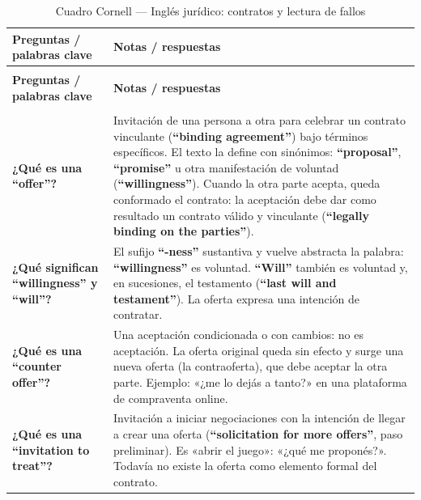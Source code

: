 \documentclass[12pt,oneside]{book}
\begin{document}
\begin{longtable}{
    >{\raggedright\arraybackslash}p{}
    >{\raggedright\arraybackslash}p{}
}
\caption{Cuadro Cornell --- Inglés jurídico: contratos y lectura de fallos} \\
\toprule
\textbf{Preguntas / palabras clave} & \textbf{Notas / respuestas} \\
\midrule
\endfirsthead

\multicolumn{2}{c}{\tablename\ \thetable{} (continuación)} \\
\toprule
\textbf{Preguntas / palabras clave} & \textbf{Notas / respuestas} \\
\midrule
\endhead

\midrule
\multicolumn{2}{r}{Continúa en la página siguiente} \\
\endfoot

\bottomrule
\endlastfoot

\textbf{¿Qué es una ``offer''?} &
Invitación de una persona a otra para celebrar un contrato vinculante (\textbf{``binding agreement''}) bajo términos específicos. El texto la define con sinónimos: \textbf{``proposal''}, \textbf{``promise''} u otra manifestación de voluntad (\textbf{``willingness''}). Cuando la otra parte acepta, queda conformado el contrato: la aceptación debe dar como resultado un contrato válido y vinculante (\textbf{``legally binding on the parties''}). \\

\textbf{¿Qué significan ``willingness'' y ``will''?} &
El sufijo \textbf{``-ness''} sustantiva y vuelve abstracta la palabra: \textbf{``willingness''} es voluntad. \textbf{``Will''} también es voluntad y, en sucesiones, el testamento (\textbf{``last will and testament''}). La oferta expresa una intención de contratar. \\

\textbf{¿Qué es una ``counter offer''?} &
Una aceptación condicionada o con cambios: no es aceptación. La oferta original queda sin efecto y surge una nueva oferta (la contraoferta), que debe aceptar la otra parte. Ejemplo: «¿me lo dejás a tanto?» en una plataforma de compraventa online. \\

\textbf{¿Qué es una ``invitation to treat''?} &
Invitación a iniciar negociaciones con la intención de llegar a crear una oferta (\textbf{``solicitation for more offers''}, paso preliminar). Es «abrir el juego»: «¿qué me proponés?». Todavía no existe la oferta como elemento formal del contrato. \\


\end{longtable}
\end{document}
